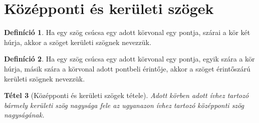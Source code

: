 \documentclass[twoside,12pt]{report}
\newtheorem{theorem}{Tétel}[section]
\theoremstyle{definition}
\newtheorem{definition}[theorem]{Definíció}
\begin{document}
\section{Középponti és kerületi szögek}
	\begin{definition}
		Ha egy szög csúcsa egy adott körvonal egy pontja, szárai a kör két húrja, akkor a szöget kerületi szögnek nevezzük.
	\end{definition}
	\begin{definition}
		Ha egy szög csúcsa egy adott körvonal egy pontja, egyik szára a kör húrja, másik szára a körvonal adott pontbeli érintője, akkor a szöget érintőszárú kerületi szögnek nevezzük.
	\end{definition}
	\begin{theorem}[Középponti és kerületi szögek tétele]
		Adott körben adott ívhez tartozó bármely kerületi szög nagysága fele az ugyanazon ívhez tartozó középponti szög nagyságának.
	\end{theorem}
\end{document}
